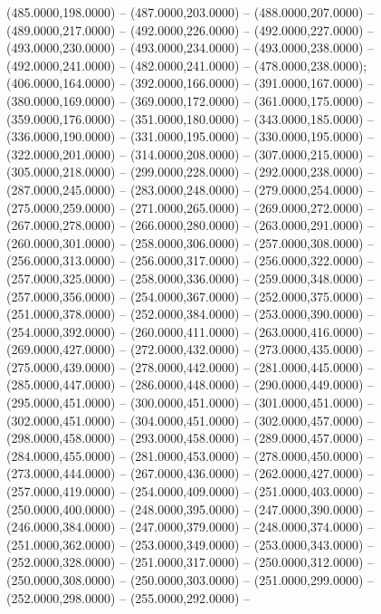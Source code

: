 \begin{scope}[shift={(-231.87,-121.87)}]
\begin{scope}[draw=black,fill=c2b83ba,line join=round,line width=0.208pt]
        (485.0000,198.0000) -- (487.0000,203.0000) -- (488.0000,207.0000) --
        (489.0000,217.0000) -- (492.0000,226.0000) -- (492.0000,227.0000) --
        (493.0000,230.0000) -- (493.0000,234.0000) -- (493.0000,238.0000) --
        (492.0000,241.0000) -- (482.0000,241.0000) -- (478.0000,238.0000);
       (406.0000,164.0000) -- (392.0000,166.0000) --
        (391.0000,167.0000) -- (380.0000,169.0000) -- (369.0000,172.0000) --
        (361.0000,175.0000) -- (359.0000,176.0000) -- (351.0000,180.0000) --
        (343.0000,185.0000) -- (336.0000,190.0000) -- (331.0000,195.0000) --
        (330.0000,195.0000) -- (322.0000,201.0000) -- (314.0000,208.0000) --
        (307.0000,215.0000) -- (305.0000,218.0000) -- (299.0000,228.0000) --
        (292.0000,238.0000) -- (287.0000,245.0000) -- (283.0000,248.0000) --
        (279.0000,254.0000) -- (275.0000,259.0000) -- (271.0000,265.0000) --
        (269.0000,272.0000) -- (267.0000,278.0000) -- (266.0000,280.0000) --
        (263.0000,291.0000) -- (260.0000,301.0000) -- (258.0000,306.0000) --
        (257.0000,308.0000) -- (256.0000,313.0000) -- (256.0000,317.0000) --
        (256.0000,322.0000) -- (257.0000,325.0000) -- (258.0000,336.0000) --
        (259.0000,348.0000) -- (257.0000,356.0000) -- (254.0000,367.0000) --
        (252.0000,375.0000) -- (251.0000,378.0000) -- (252.0000,384.0000) --
        (253.0000,390.0000) -- (254.0000,392.0000) -- (260.0000,411.0000) --
        (263.0000,416.0000) -- (269.0000,427.0000) -- (272.0000,432.0000) --
        (273.0000,435.0000) -- (275.0000,439.0000) -- (278.0000,442.0000) --
        (281.0000,445.0000) -- (285.0000,447.0000) -- (286.0000,448.0000) --
        (290.0000,449.0000) -- (295.0000,451.0000) -- (300.0000,451.0000) --
        (301.0000,451.0000) -- (302.0000,451.0000) -- (304.0000,451.0000) --
        (302.0000,457.0000) -- (298.0000,458.0000) -- (293.0000,458.0000) --
        (289.0000,457.0000) -- (284.0000,455.0000) -- (281.0000,453.0000) --
        (278.0000,450.0000) -- (273.0000,444.0000) -- (267.0000,436.0000) --
        (262.0000,427.0000) -- (257.0000,419.0000) -- (254.0000,409.0000) --
        (251.0000,403.0000) -- (250.0000,400.0000) -- (248.0000,395.0000) --
        (247.0000,390.0000) -- (246.0000,384.0000) -- (247.0000,379.0000) --
        (248.0000,374.0000) -- (251.0000,362.0000) -- (253.0000,349.0000) --
        (253.0000,343.0000) -- (252.0000,328.0000) -- (251.0000,317.0000) --
        (250.0000,312.0000) -- (250.0000,308.0000) -- (250.0000,303.0000) --
        (251.0000,299.0000) -- (252.0000,298.0000) -- (255.0000,292.0000) --

\end{scope}
\end{scope}
